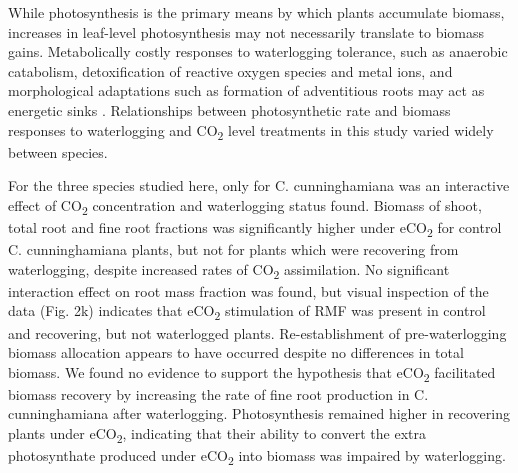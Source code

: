 \documentclass[12pt,a4paper]{memoir}
\begin{document}
While photosynthesis is the primary means by which plants accumulate biomass, increases in leaf-level photosynthesis may not necessarily translate to biomass gains. Metabolically costly responses to waterlogging tolerance, such as anaerobic catabolism, detoxification of reactive oxygen species and metal ions, and morphological adaptations such as formation of adventitious roots may act as energetic sinks \citep{Colmer2009}. Relationships between photosynthetic rate and biomass responses to waterlogging and CO\textsubscript{2} level treatments in this study varied widely between species.

For the three species studied here, only for C. cunninghamiana was an interactive effect of CO\textsubscript{2} concentration and waterlogging status found. Biomass of shoot, total root and fine root fractions was significantly higher under eCO\textsubscript{2} for control C. cunninghamiana plants, but not for plants which were recovering from waterlogging, despite increased rates of CO\textsubscript{2} assimilation. No significant interaction effect on root mass fraction was found, but visual inspection of the data (Fig. 2k) indicates that eCO\textsubscript{2} stimulation of RMF was present in control and recovering, but not waterlogged plants. Re-establishment of pre-waterlogging biomass allocation appears to have occurred despite no differences in total biomass. We found no evidence to support the hypothesis that eCO\textsubscript{2} facilitated biomass recovery by increasing the rate of fine root production in C. cunninghamiana after waterlogging. Photosynthesis remained higher in recovering plants under eCO\textsubscript{2}, indicating that their ability to convert the extra photosynthate produced under eCO\textsubscript{2} into biomass was impaired by waterlogging. 
\end{document}
